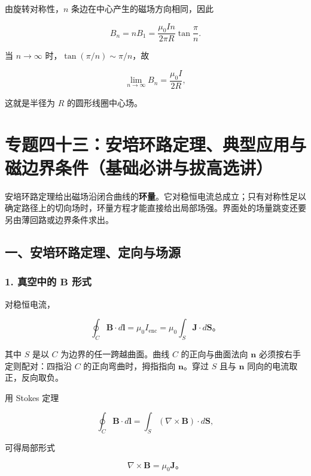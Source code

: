 由旋转对称性，\(n\) 条边在中心产生的磁场方向相同，因此

\[
B_n=nB_1
=\boxed{
\frac{\mu_0In}{2\pi R}
\tan\frac{\pi}{n}
}.
\]

当 \(n\to\infty\) 时，\(\tan(\pi/n)\sim\pi/n\)，故

\[
\lim_{n\to\infty}B_n
=\frac{\mu_0I}{2R},
\]

这就是半径为 \(R\) 的圆形线圈中心场。

\section{专题四十三：安培环路定理、典型应用与磁边界条件（基础必讲与拔高选讲）}\label{m5:ux4e13ux9898ux56dbux5341ux4e09ux5b89ux57f9ux73afux8defux5b9aux7406ux5178ux578bux5e94ux7528ux4e0eux78c1ux8fb9ux754cux6761ux4ef6ux57faux7840ux5fc5ux8bb2ux4e0eux62d4ux9ad8ux9009ux8bb2}

安培环路定理给出磁场沿闭合曲线的\textbf{环量}。它对稳恒电流总成立；只有对称性足以确定路径上的切向场时，环量方程才能直接给出局部场强。界面处的场量跳变还要另由薄回路或边界条件求出。

\subsection{一、安培环路定理、定向与场源}\label{m5:ux4e00ux5b89ux57f9ux73afux8defux5b9aux7406ux5b9aux5411ux4e0eux573aux6e90}

\subsubsection{\texorpdfstring{1. 真空中的 \(\mathbf B\)
形式}{1. 真空中的 \textbackslash mathbf B 形式}}\label{m5:ux771fux7a7aux4e2dux7684-mathbf-b-ux5f62ux5f0f}

对稳恒电流，

\[
\boxed{\oint_C\mathbf B\cdot d\mathbf l
=\mu_0I_{\mathrm{enc}}
=\mu_0\int_S\mathbf J\cdot d\mathbf S}\text{。}
\]

其中 \(S\) 是以 \(C\) 为边界的任一跨越曲面。曲线 \(C\) 的正向与曲面法向
\(\mathbf n\) 必须按右手定则配对：四指沿 \(C\) 的正向弯曲时，拇指指向
\(\mathbf n\)。穿过 \(S\) 且与 \(\mathbf n\) 同向的电流取正，反向取负。

用 Stokes 定理

\[
\oint_C\mathbf B\cdot d\mathbf l
=\int_S(\nabla\times\mathbf B)\cdot d\mathbf S,
\]

可得局部形式

\[
\boxed{\nabla\times\mathbf B=\mu_0\mathbf J}\text{。}
\]

